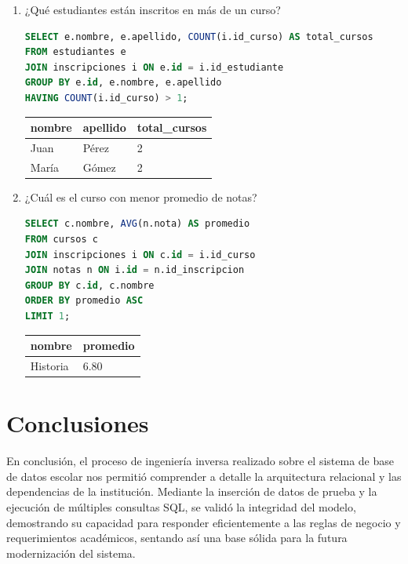\documentclass[12pt,letterpaper]{article}
\begin{document}
\begin{enumerate}
    \item ¿Qué estudiantes están inscritos en más de un curso?
\begin{lstlisting}[language=SQL, frame=single]
SELECT e.nombre, e.apellido, COUNT(i.id_curso) AS total_cursos 
FROM estudiantes e 
JOIN inscripciones i ON e.id = i.id_estudiante 
GROUP BY e.id, e.nombre, e.apellido 
HAVING COUNT(i.id_curso) > 1;
\end{lstlisting}
    \begin{table}[H]
        \centering
        \begin{tabular}{|l|l|l|}
        \hline
        \textbf{nombre} & \textbf{apellido} & \textbf{total\_cursos} \\ \hline
        Juan & Pérez & 2 \\ 
        María & Gómez & 2 \\ \hline
        \end{tabular}
    \end{table}

    \item ¿Cuál es el curso con menor promedio de notas?
\begin{lstlisting}[language=SQL, frame=single]
SELECT c.nombre, AVG(n.nota) AS promedio 
FROM cursos c 
JOIN inscripciones i ON c.id = i.id_curso 
JOIN notas n ON i.id = n.id_inscripcion 
GROUP BY c.id, c.nombre 
ORDER BY promedio ASC 
LIMIT 1;
\end{lstlisting}
    \begin{table}[H]
        \centering
        \begin{tabular}{|l|l|}
        \hline
        \textbf{nombre} & \textbf{promedio} \\ \hline
        Historia & 6.80 \\ \hline
        \end{tabular}
    \end{table}
\end{enumerate}

\section{Conclusiones}
En conclusión, el proceso de ingeniería inversa realizado sobre el sistema de base de datos escolar nos permitió comprender a detalle la arquitectura relacional y las dependencias de la institución. Mediante la inserción de datos de prueba y la ejecución de múltiples consultas SQL, se validó la integridad del modelo, demostrando su capacidad para responder eficientemente a las reglas de negocio y requerimientos académicos, sentando así una base sólida para la futura modernización del sistema.
\end{document}
